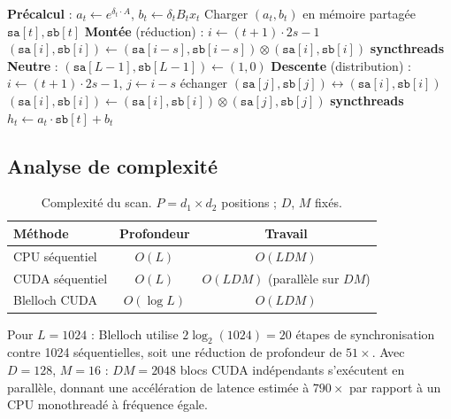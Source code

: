 \documentclass[10pt,onecolumn]{article}
\begin{document}
\begin{algorithm}[H]
\caption{Scan SSM de Blelloch (un bloc, une paire $(d,m)$)}
\label{alg:blelloch}
\begin{algorithmic}[1]
\State \textbf{Précalcul} : $a_t \leftarrow e^{\delta_t \cdot A}$, $b_t \leftarrow \delta_t B_t x_t$ \hfill {}
\State Charger $(a_t, b_t)$ en mémoire partagée $\mathtt{sa}[t], \mathtt{sb}[t]$
\State \textbf{Montée} (réduction) :
  \State $i \leftarrow (t+1)\cdot 2s - 1$
   $(\mathtt{sa}[i], \mathtt{sb}[i]) \leftarrow (\mathtt{sa}[i{-}s], \mathtt{sb}[i{-}s]) \otimes (\mathtt{sa}[i], \mathtt{sb}[i])$ \EndIf
  \State \textbf{syncthreads}
\EndFor
\State \textbf{Neutre} : $(\mathtt{sa}[L{-}1], \mathtt{sb}[L{-}1]) \leftarrow (1, 0)$
\State \textbf{Descente} (distribution) :
  \State $i \leftarrow (t+1)\cdot 2s - 1$, $j \leftarrow i - s$
    \State échanger $(\mathtt{sa}[j], \mathtt{sb}[j]) \leftrightarrow (\mathtt{sa}[i], \mathtt{sb}[i])$
    \State $(\mathtt{sa}[i], \mathtt{sb}[i]) \leftarrow (\mathtt{sa}[i], \mathtt{sb}[i]) \otimes (\mathtt{sa}[j], \mathtt{sb}[j])$
  \EndIf
  \State \textbf{syncthreads}
\EndFor
\State $h_t \leftarrow a_t \cdot \mathtt{sb}[t] + b_t$ \hfill {}
\end{algorithmic}
\end{algorithm}

\subsection{Analyse de complexité}

\begin{table}[htbp]
\centering
\caption{Complexité du scan. $P = d_1 \times d_2$ positions ; $D$, $M$ fixés.}
\label{tab:complexity}
\begin{tabular}{lcc}
\toprule
Méthode & Profondeur & Travail \\
\midrule
CPU séquentiel & $O(L)$ & $O(LDM)$ \\
CUDA séquentiel & $O(L)$ & $O(LDM)$ (parallèle sur $DM$) \\
Blelloch CUDA & $O(\log L)$ & $O(LDM)$ \\
\bottomrule
\end{tabular}
\end{table}

Pour $L = 1024$ : Blelloch utilise $2\log_2(1024) = 20$ étapes de synchronisation
contre 1024 séquentielles, soit une réduction de profondeur de $51\times$.
Avec $D = 128$, $M = 16$ : $DM = 2048$ blocs CUDA indépendants s'exécutent en
parallèle, donnant une accélération de latence estimée à $790\times$ par rapport
à un CPU monothreadé à fréquence égale.
\end{document}
